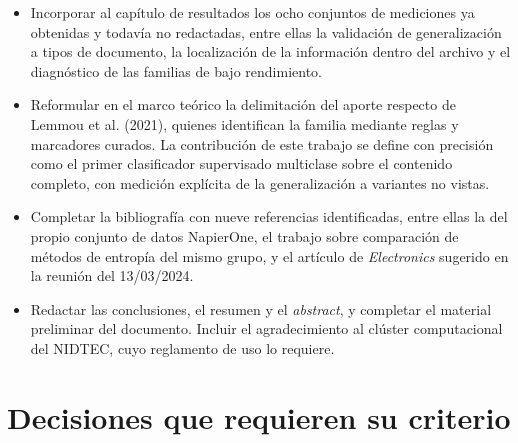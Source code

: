 \documentclass[11pt,a4paper]{article}
\begin{document}
\begin{itemize}
\item Incorporar al capítulo de resultados los ocho conjuntos de mediciones ya obtenidas y
todavía no redactadas, entre ellas la validación de generalización a tipos de documento, la
localización de la información dentro del archivo y el diagnóstico de las familias de bajo
rendimiento.
\item Reformular en el marco teórico la delimitación del aporte respecto de Lemmou et al.
(2021), quienes identifican la familia mediante reglas y marcadores curados. La contribución
de este trabajo se define con precisión como el primer clasificador supervisado multiclase
sobre el contenido completo, con medición explícita de la generalización a variantes no vistas.
\item Completar la bibliografía con nueve referencias identificadas, entre ellas la del propio
conjunto de datos NapierOne, el trabajo sobre comparación de métodos de entropía del mismo
grupo, y el artículo de \textit{Electronics} sugerido en la reunión del 13/03/2024.
\item Redactar las conclusiones, el resumen y el \textit{abstract}, y completar el material
preliminar del documento. Incluir el agradecimiento al clúster computacional del NIDTEC, cuyo
reglamento de uso lo requiere.
\end{itemize}

\section*{Decisiones que requieren su criterio}
\end{document}
